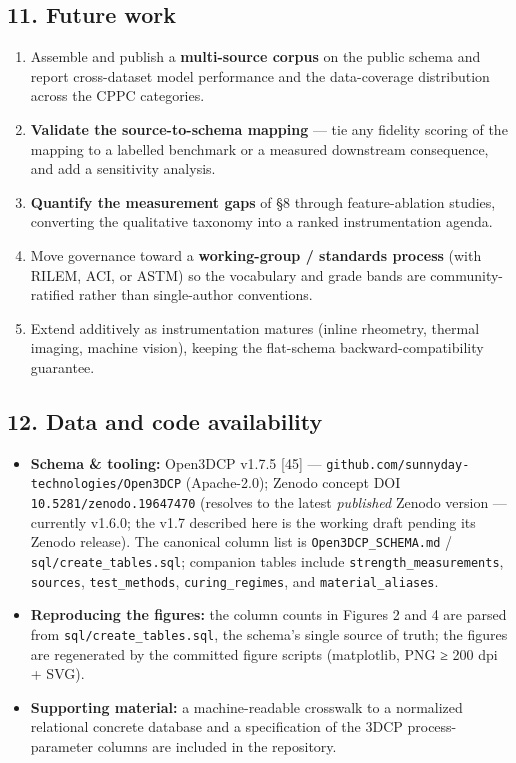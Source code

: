 \documentclass[
  11pt,
  letterpaper,
]{article}
\providecommand{\tightlist}{%
  \setlength{\itemsep}{0pt}\setlength{\parskip}{0pt}}
\begin{document}
\subsection{11. Future work}\label{future-work}

\begin{enumerate}
\def\labelenumi{\arabic{enumi}.}
\tightlist
\item
  Assemble and publish a \textbf{multi-source corpus} on the public
  schema and report cross-dataset model performance and the
  data-coverage distribution across the CPPC categories.
\item
  \textbf{Validate the source-to-schema mapping} --- tie any fidelity
  scoring of the mapping to a labelled benchmark or a measured
  downstream consequence, and add a sensitivity analysis.
\item
  \textbf{Quantify the measurement gaps} of §8 through feature-ablation
  studies, converting the qualitative taxonomy into a ranked
  instrumentation agenda.
\item
  Move governance toward a \textbf{working-group / standards process}
  (with RILEM, ACI, or ASTM) so the vocabulary and grade bands are
  community-ratified rather than single-author conventions.
\item
  Extend additively as instrumentation matures (inline rheometry,
  thermal imaging, machine vision), keeping the flat-schema
  backward-compatibility guarantee.
\end{enumerate}

\subsection{12. Data and code
availability}\label{data-and-code-availability}

\begin{itemize}
\tightlist
\item
  \textbf{Schema \& tooling:} Open3DCP v1.7.5 {[}45{]} ---
  \texttt{github.com/sunnyday-technologies/Open3DCP} (Apache-2.0);
  Zenodo concept DOI \texttt{10.5281/zenodo.19647470} (resolves to the
  latest \emph{published} Zenodo version --- currently v1.6.0; the v1.7
  described here is the working draft pending its Zenodo release). The
  canonical column list is \texttt{Open3DCP\_SCHEMA.md} /
  \texttt{sql/create\_tables.sql}; companion tables include
  \texttt{strength\_measurements}, \texttt{sources},
  \texttt{test\_methods}, \texttt{curing\_regimes}, and
  \texttt{material\_aliases}.
\item
  \textbf{Reproducing the figures:} the column counts in Figures 2 and 4
  are parsed from \texttt{sql/create\_tables.sql}, the schema's single
  source of truth; the figures are regenerated by the committed figure
  scripts (matplotlib, PNG ≥ 200 dpi + SVG).
\item
  \textbf{Supporting material:} a machine-readable crosswalk to a
  normalized relational concrete database and a specification of the
  3DCP process-parameter columns are included in the repository.
\end{itemize}
\end{document}
